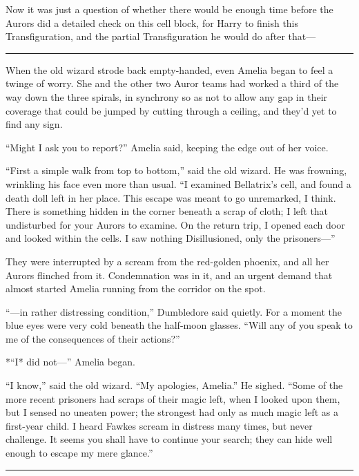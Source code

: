 Now it was just a question of whether there would be enough time before
the Aurors did a detailed check on this cell block, for Harry to finish
this Transfiguration, and the partial Transfiguration he would do after
that---

\begin{center}\rule{3in}{0.4pt}\end{center}

When the old wizard strode back empty-handed, even Amelia began to feel
a twinge of worry. She and the other two Auror teams had worked a third
of the way down the three spirals, in synchrony so as not to allow any
gap in their coverage that could be jumped by cutting through a ceiling,
and they'd yet to find any sign.

``Might I ask you to report?'' Amelia said, keeping the edge out of her
voice.

``First a simple walk from top to bottom,'' said the old wizard. He was
frowning, wrinkling his face even more than usual. ``I examined
Bellatrix's cell, and found a death doll left in her place. This escape
was meant to go unremarked, I think. There is something hidden in the
corner beneath a scrap of cloth; I left that undisturbed for your Aurors
to examine. On the return trip, I opened each door and looked within the
cells. I saw nothing Disillusioned, only the prisoners---''

They were interrupted by a scream from the red-golden phoenix, and all
her Aurors flinched from it. Condemnation was in it, and an urgent
demand that almost started Amelia running from the corridor on the spot.

``---in rather distressing condition,'' Dumbledore said quietly. For a
moment the blue eyes were very cold beneath the half-moon glasses.
``Will any of you speak to me of the consequences of their actions?''

*``I* did not---'' Amelia began.

``I know,'' said the old wizard. ``My apologies, Amelia.'' He sighed.
``Some of the more recent prisoners had scraps of their magic left, when
I looked upon them, but I sensed no uneaten power; the strongest had
only as much magic left as a first-year child. I heard Fawkes scream in
distress many times, but never challenge. It seems you shall have to
continue your search; they can hide well enough to escape my mere
glance.''

\begin{center}\rule{3in}{0.4pt}\end{center}

